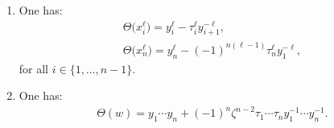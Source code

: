 \begin{Lemma}\label{keylemma}\quad
\begin{enumerate}\itemsep=0pt
\item[$(i)$] One has:
\begin{gather}
\Theta\big(x_i^\ell\big) = y_i^\ell - \tau_i^\ell y_{i+1}^{-\ell},
\label{thetaxil}
\\
\Theta\big(x_n^\ell\big) = y_n^\ell - (-1)^{n(\ell-1)} \tau_n^\ell y_1^{-\ell},
\label{thetaxnl}
\end{gather}
for all $i\in \{1,\ldots, n-1\}$.

\item[$(ii)$] One has:
\begin{gather}
\label{thetaw}
\Theta(w) = y_1\cdots y_n + (-1)^n \zeta^{n-2} \tau_1\cdots \tau_n y_1^{-1} \cdots y_n^{-1}.
\end{gather}
\end{enumerate}
\end{Lemma}

